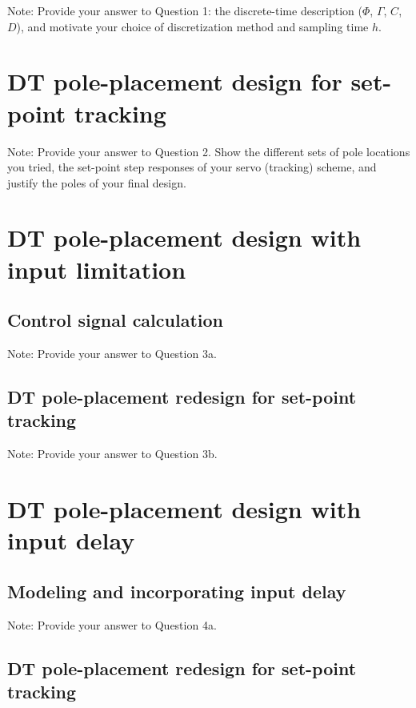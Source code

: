 \documentclass{article}
\begin{document}
{\color{red}Note: Provide your answer to Question 1: the discrete-time description ($\Phi$, $\Gamma$, $C$, $D$), and motivate your choice of discretization method and sampling time $h$.}


\section{DT pole-placement design for set-point tracking}

{\color{red}Note: Provide your answer to Question 2. Show the different sets of pole locations you tried, the set-point step responses of your servo (tracking) scheme, and justify the poles of your final design.}

\section{DT pole-placement design with input limitation}

\subsection{Control signal calculation}

{\color{red}Note: Provide your answer to Question 3a.}

\subsection{DT pole-placement redesign for set-point tracking}

{\color{red}Note: Provide your answer to Question 3b.}

\section{DT pole-placement design with input delay}

\subsection{Modeling and incorporating input delay}

{\color{red}Note: Provide your answer to Question 4a.}

\subsection{DT pole-placement redesign for set-point tracking}
\end{document}
